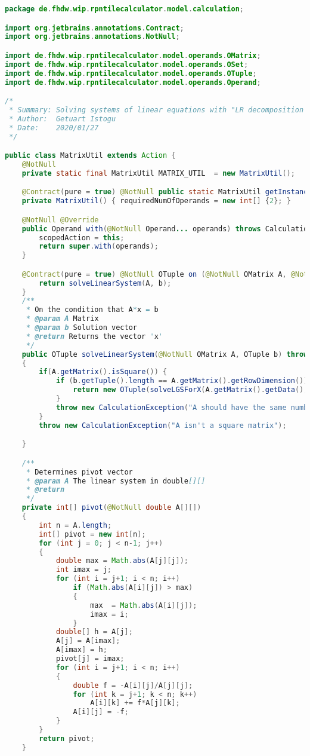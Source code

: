 \begin{lstlisting}[caption=MatrixUtil (Istogu),label=list:MatrixUtil,language=Java]
package de.fhdw.wip.rpntilecalculator.model.calculation;

import org.jetbrains.annotations.Contract;
import org.jetbrains.annotations.NotNull;

import de.fhdw.wip.rpntilecalculator.model.operands.OMatrix;
import de.fhdw.wip.rpntilecalculator.model.operands.OSet;
import de.fhdw.wip.rpntilecalculator.model.operands.OTuple;
import de.fhdw.wip.rpntilecalculator.model.operands.Operand;

/*
 * Summary: Solving systems of linear equations with "LR decomposition with column pivot search"
 * Author:  Getuart Istogu
 * Date:    2020/01/27
 */

public class MatrixUtil extends Action {
    @NotNull
    private static final MatrixUtil MATRIX_UTIL  = new MatrixUtil();

    @Contract(pure = true) @NotNull public static MatrixUtil getInstance() { return MATRIX_UTIL; }
    private MatrixUtil() { requiredNumOfOperands = new int[] {2}; }

    @NotNull @Override
    public Operand with(@NotNull Operand... operands) throws CalculationException {
        scopedAction = this;
        return super.with(operands);
    }

    @Contract(pure = true) @NotNull OTuple on (@NotNull OMatrix A, @NotNull OTuple b) throws CalculationException {
        return solveLinearSystem(A, b);
    }
    /**
     * On the condition that A*x = b
     * @param A Matrix
     * @param b Solution vector
     * @return Returns the vector 'x'
     */
    public OTuple solveLinearSystem(@NotNull OMatrix A, OTuple b) throws CalculationException
    {
        if(A.getMatrix().isSquare()) {
            if (b.getTuple().length == A.getMatrix().getRowDimension()) {
                return new OTuple(solveLGSForX(A.getMatrix().getData(), b.getTuple()));
            }
            throw new CalculationException("A should have the same number of rows/columns as b values.");
        }
        throw new CalculationException("A isn't a square matrix");

    }

    /**
     * Determines pivot vector
     * @param A The linear system in double[][]
     * @return
     */
    private int[] pivot(@NotNull double A[][])
    {
        int n = A.length;
        int[] pivot = new int[n];
        for (int j = 0; j < n-1; j++)
        {
            double max = Math.abs(A[j][j]);
            int imax = j;
            for (int i = j+1; i < n; i++)
                if (Math.abs(A[i][j]) > max)
                {
                    max  = Math.abs(A[i][j]);
                    imax = i;
                }
            double[] h = A[j];
            A[j] = A[imax];
            A[imax] = h;
            pivot[j] = imax;
            for (int i = j+1; i < n; i++)
            {
                double f = -A[i][j]/A[j][j];
                for (int k = j+1; k < n; k++)
                    A[i][k] += f*A[j][k];
                A[i][j] = -f;
            }
        }
        return pivot;
    }


\end{lstlisting}
